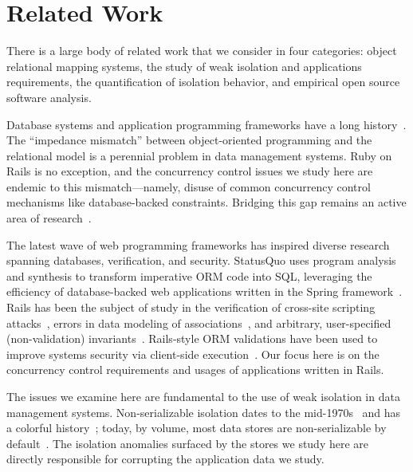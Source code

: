 
\section{Related Work}
\label{sec:relatedwork}

There is a large body of related work that we consider in four
categories: object relational mapping systems, the study of weak
isolation and applications requirements, the quantification of isolation
behavior, and empirical open source software analysis.

 Database systems and application programming
frameworks have a long
history~\cite{objectstore,shore,bernstein-orm}. The ``impedance
mismatch'' between object-oriented programming and the relational
model is a perennial problem in data management systems. Ruby on Rails
is no exception, and the concurrency control issues we study here are
endemic to this mismatch---namely, disuse of common concurrency
control mechanisms like database-backed constraints. Bridging this gap
remains an active area of research~\cite{db-to-model}.

The latest wave of web programming frameworks has inspired diverse
research spanning databases, verification, and security. StatusQuo
uses program analysis and synthesis to transform imperative ORM code
into SQL, leveraging the efficiency of database-backed web
applications written in the Spring framework~\cite{statusquo}. Rails
has been the subject of study in the verification of cross-site
scripting attacks~\cite{rails-xss}, errors in data
modeling of associations~\cite{rails-bounded}, and arbitrary,
user-specified (non-validation) invariants~\cite{invariant-web}.
Rails-style ORM validations have been used to improve systems security
via client-side execution~\cite{waves,caveat}. Our focus here is on
the concurrency control requirements and usages of applications
written in Rails.

 The issues we examine here
are fundamental to the use of weak isolation in data management
systems. Non-serializable isolation dates to the
mid-1970s~\cite{gray-isolation} and has a colorful
history~\cite{adya-isolation}; today, by volume, most data stores are
non-serializable by default~\cite{hat-vldb}. The isolation anomalies
surfaced by the stores we study here are directly responsible for
corrupting the application data we study.

